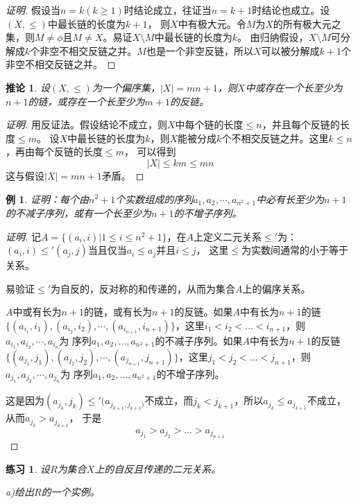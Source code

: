 \documentclass{article}
\newtheorem{Exercise}{练习}
\newtheorem{Example}{例}
\newtheorem{Cor}{推论}
\begin{document}
\begin{CJK*}{UTF8}{gbsn}
\begin{proof}[证明]
    假设当$n=k(k\geq 1)$时结论成立，往证当$n=k+1$时结论也成立。设$(X,\leq)$中最长链的长度为$k+1$，
    则$X$中有极大元。令$M$为$X$的所有极大元之集，则$M\neq \phi$且$M\neq X$。易证$X\setminus M$中最长链的长度为$k$。
    由归纳假设，$X\setminus M$可分解成$k$个非空不相交反链之并。$M$也是一个非空反链，所以$X$可以被分解成$k+1$个非空不相交反链之并。
  \end{proof}
  \begin{Cor}
    设$(X,\leq)$为一个偏序集，$|X|=mn+1$，则$X$中或存在一个长至少为$n+1$的链，或存在一个长至少为$m+1$的反链。
  \end{Cor}
  \begin{proof}[证明]
       用反证法。假设结论不成立，则$X$中每个链的长度$\leq n$，并且每个反链的长度$\leq m$。
       设$X$中最长链的长度为$k$，则$X$能被分成$k$个不相交反链之并。这里$k\leq n$，再由每个反链的长度$\leq m$，
        可以得到\[|X|\leq km \leq mn\]
        这与假设$|X|=mn+1$矛盾。
  \end{proof}
  \begin{Example}
    证明：每个由$n^2+1$个实数组成的序列$a_1,a_2,\cdots,a_{n^2+1}$中必有长至少为$n+1$的不减子序列，或有一个长至少为$n+1$的不增子序列。
  \end{Example}
\begin{proof}[证明]
  记$A=\{(a_i,i)|1\leq i \leq n^2+1\}$，在$A$上定义二元关系$\leq'$为：$(a_i,i)\leq'(a_j,j)$当且仅当$a_i\leq a_j$并且$i\leq j$，
  这里$\leq$为实数间通常的小于等于关系。

  易验证$\leq'$为自反的，反对称的和传递的，从而为集合$A$上的偏序关系。

  $A$中或有长为$n+1$的链，或有长为$n+1$的反链。如果$A$中有长为$n+1$的链$\{(a_{i_1},i_1),(a_{i_2},i_2),\cdots, (a_{i_{n+1}},i_{n+1})\}$，这里$i_1<i_2<\ldots<i_{n+1}$，则$a_{i_1},a_{i_2},\cdots,a_{i_n}$为
  序列$a_1,a_2,\ldots,a_{n^2+1}$的不减子序列。如果$A$中有长为$n+1$的反链$\{(a_{j_1},j_1),(a_{j_2},j_2),\cdots, (a_{j_{n+1}},j_{n+1})\}$，这里$j_1<j_2<\ldots<j_{n+1}$，则$a_{j_1},a_{j_2},\cdots,a_{j_n}$为
  序列$a_1,a_2,\ldots,a_{n^2+1}$的不增子序列。

  这是因为$(a_{j_k},j_k)\leq'(a_{j_{k+1},j_{k+1})}$不成立，而$j_k<j_{k+1}$，所以$a_{j_k}\leq a_{j_{k+1}}$不成立，从而$a_{j_k}> a_{j_{k+1}}$，
  于是
  \[a_{j_1}> a_{j_2}> \ldots> a_{j_{n+1}}\]

\end{proof}
\begin{Exercise}
  设$R$为集合$X$上的自反且传递的二元关系。

a)给出$R$的一个实例。


\end{Exercise}
\end{CJK*}
\end{document}
